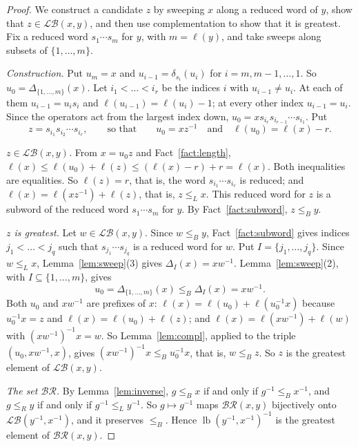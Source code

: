 \documentclass[11pt]{amsart}
\theoremstyle{definition}
\theoremstyle{remark}
\numberwithin{equation}{section}
\newcommand{\LB}{\mathcal{LB}}
\newcommand{\BR}{\mathcal{BR}}
\newcommand{\leR}{\le_R}
\newcommand{\leL}{\le_L}
\newcommand{\leB}{\le_B}
\DeclareMathOperator{\lb}{lb}
\begin{document}
\begin{proof}
We construct a candidate \(z\) by sweeping \(x\) along a reduced word of \(y\), show that \(z\in\LB(x,y)\), and then use complementation to show that it is greatest. Fix a reduced word \(s_1\cdots s_m\) for \(y\), with \(m=\ell(y)\), and take sweeps along subsets of \(\{1,\dots,m\}\).

\emph{Construction.} Put \(u_m=x\) and \(u_{i-1}=\delta_{s_i}(u_i)\) for \(i=m,m-1,\dots,1\). So \(u_0=\Delta_{\{1,\dots,m\}}(x)\). Let \(i_1<\dots<i_r\) be the indices \(i\) with \(u_{i-1}\neq u_i\). At each of them \(u_{i-1}=u_is_i\) and \(\ell(u_{i-1})=\ell(u_i)-1\); at every other index \(u_{i-1}=u_i\). Since the operators act from the largest index down, \(u_0=xs_{i_r}s_{i_{r-1}}\cdots s_{i_1}\). Put
\[
z=s_{i_1}s_{i_2}\cdots s_{i_r},\qquad\text{so that}\qquad u_0=xz^{-1}\quad\text{and}\quad\ell(u_0)=\ell(x)-r.
\]

\emph{\(z\in\LB(x,y)\).} From \(x=u_0z\) and Fact~\ref{fact:length}, \(\ell(x)\le\ell(u_0)+\ell(z)\le(\ell(x)-r)+r=\ell(x)\). Both inequalities are equalities. So \(\ell(z)=r\), that is, the word \(s_{i_1}\cdots s_{i_r}\) is reduced; and \(\ell(x)=\ell(xz^{-1})+\ell(z)\), that is, \(z\leL x\). This reduced word for \(z\) is a subword of the reduced word \(s_1\cdots s_m\) for \(y\). By Fact~\ref{fact:subword}, \(z\leB y\).

\emph{\(z\) is greatest.} Let \(w\in\LB(x,y)\). Since \(w\leB y\), Fact~\ref{fact:subword} gives indices \(j_1<\dots<j_q\) such that \(s_{j_1}\cdots s_{j_q}\) is a reduced word for \(w\). Put \(I=\{j_1,\dots,j_q\}\). Since \(w\leL x\), Lemma~\ref{lem:sweep}(3) gives \(\Delta_I(x)=xw^{-1}\). Lemma~\ref{lem:sweep}(2), with \(I\subseteq\{1,\dots,m\}\), gives
\[
u_0=\Delta_{\{1,\dots,m\}}(x)\leB\Delta_I(x)=xw^{-1}.
\]
Both \(u_0\) and \(xw^{-1}\) are prefixes of \(x\): \(\ell(x)=\ell(u_0)+\ell(u_0^{-1}x)\) because \(u_0^{-1}x=z\) and \(\ell(x)=\ell(u_0)+\ell(z)\); and \(\ell(x)=\ell(xw^{-1})+\ell(w)\) with \((xw^{-1})^{-1}x=w\). So Lemma~\ref{lem:compl}, applied to the triple \((u_0,xw^{-1},x)\), gives \((xw^{-1})^{-1}x\leB u_0^{-1}x\), that is, \(w\leB z\). So \(z\) is the greatest element of \(\LB(x,y)\).

\emph{The set \(\BR\).} By Lemma~\ref{lem:inverse}, \(g\leB x\) if and only if \(g^{-1}\leB x^{-1}\), and \(g\leR y\) if and only if \(g^{-1}\leL y^{-1}\). So \(g\mapsto g^{-1}\) maps \(\BR(x,y)\) bijectively onto \(\LB(y^{-1},x^{-1})\), and it preserves \(\leB\). Hence \(\lb(y^{-1},x^{-1})^{-1}\) is the greatest element of \(\BR(x,y)\).
\end{proof}
\end{document}
